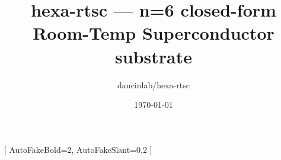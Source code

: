 %
%
%

\usepackage{fontspec}
\usepackage{xeCJK}
\setmainfont{TeX Gyre Termes}
\setsansfont{TeX Gyre Heros}
\setmonofont{TeX Gyre Cursor}
[%
  AutoFakeBold=2,%
  AutoFakeSlant=0.2%
]

\usepackage{amsmath}
\usepackage{amssymb}
\usepackage{unicode-math}

\usepackage[a4paper,margin=2.5cm]{geometry}
\usepackage{microtype}
\setlength{\parskip}{0.5\baselineskip}
\setlength{\parindent}{0pt}

\usepackage{longtable}
\usepackage{booktabs}
\usepackage{array}

\usepackage{fvextra}
\usepackage{xcolor}

\usepackage[%
  colorlinks=true,%
  linkcolor=black,%
  urlcolor=blue,%
  citecolor=teal,%
  pdfborder={0 0 0}%
]{hyperref}

\title{hexa-rtsc — n=6 closed-form Room-Temp Superconductor substrate}
\author{dancinlab/hexa-rtsc}
\date{\today}
